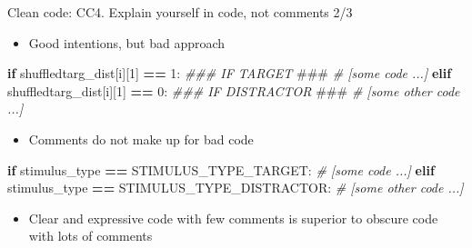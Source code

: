 \documentclass[
  8pt,
  ignorenonframetext,
]{beamer}
\newenvironment{Shaded}{\begin{snugshade}}{\end{snugshade}}
\newcommand{\AlertTok}[1]{\textcolor[rgb]{0.94,0.16,0.16}{#1}}
\newcommand{\CommentTok}[1]{\textcolor[rgb]{0.56,0.35,0.01}{\textit{#1}}}
\newcommand{\ControlFlowTok}[1]{\textcolor[rgb]{0.13,0.29,0.53}{\textbf{#1}}}
\newcommand{\DecValTok}[1]{\textcolor[rgb]{0.00,0.00,0.81}{#1}}
\newcommand{\NormalTok}[1]{#1}
\newcommand{\OperatorTok}[1]{\textcolor[rgb]{0.81,0.36,0.00}{\textbf{#1}}}
\providecommand{\tightlist}{%
  \setlength{\itemsep}{0pt}\setlength{\parskip}{0pt}}
\begin{document}
\begin{frame}[fragile]{Clean code: CC4. Explain yourself in code, not
comments 2/3}
\protect\hypertarget{clean-code-cc4.-explain-yourself-in-code-not-comments-23}{}
\begin{itemize}
\tightlist
\item
  Good intentions, but bad approach
\end{itemize}

\begin{Shaded}
\begin{Highlighting}[]
\ControlFlowTok{if}\NormalTok{ shuffledtarg\_dist[i][}\DecValTok{1}\NormalTok{] }\OperatorTok{==} \DecValTok{1}\NormalTok{: }\CommentTok{\#\#\# IF TARGET }\AlertTok{\#\#\#}
    \CommentTok{\# [some code ...]}
\ControlFlowTok{elif}\NormalTok{ shuffledtarg\_dist[i][}\DecValTok{1}\NormalTok{] }\OperatorTok{==} \DecValTok{0}\NormalTok{: }\CommentTok{\#\#\# IF DISTRACTOR }\AlertTok{\#\#\#}
    \CommentTok{\# [some other code ...]}
\end{Highlighting}
\end{Shaded}

\begin{itemize}
\tightlist
\item
  Comments do not make up for bad code
\end{itemize}

\begin{Shaded}
\begin{Highlighting}[]
\ControlFlowTok{if}\NormalTok{ stimulus\_type }\OperatorTok{==}\NormalTok{ STIMULUS\_TYPE\_TARGET:}
    \CommentTok{\# [some code ...]}
\ControlFlowTok{elif}\NormalTok{ stimulus\_type }\OperatorTok{==}\NormalTok{ STIMULUS\_TYPE\_DISTRACTOR:}
    \CommentTok{\# [some other code ...]}
\end{Highlighting}
\end{Shaded}

\begin{itemize}
\tightlist
\item
  Clear and expressive code with few comments is superior to obscure
  code with lots of comments
\end{itemize}
\end{frame}
\end{document}
